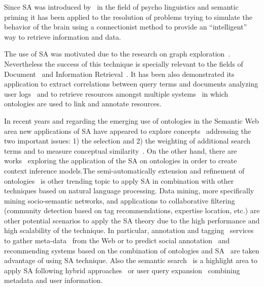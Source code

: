 Since SA was introduced by~\cite{Collins_Loftus_1975} in the field of 
psycho linguistics and semantic priming it has been applied to the resolution
of problems trying to simulate the behavior of the brain using a connectionist method
to provide an ``intelligent'' way to retrieve information and data. 

The use of SA was motivated due to the research on graph exploration~\cite{Scott1981,AndersonTheory}. Nevertheless
the success of this technique is specially relevant to the fields of Document~\cite{turtle91inference} 
and Information Retrieval~\cite{Cohen1987}. It has
been also demonstrated its application to extract correlations between query terms and documents analyzing user 
logs~\cite{Cui03} and to retrieve resources amongst multiple systems~\cite{Schumacher+2008search} 
in which ontologies are used to link and annotate resources.

In recent years and regarding the emerging use of ontologies in the Semantic Web area new applications of SA have
appeared to explore concepts~\cite{Qiu93,Chen95,Teufl:jucs_17_7:knowledge_extraction_from_RDF} addressing the two important issues: 1) the selection and 2) the weighting of
additional search terms and to measure conceptual similarity~\cite{gouws-vanrooyen-engelbrecht:2010:CCSR}. 
On the other hand, there are works~\cite{DBLP:journals/cogsr/KatiforiVD10} 
exploring the application of the SA on ontologies in order to create context inference models.The 
semi-automatically extension and refinement of ontologies~\cite{liu_et_al_2005} is other trending topic to apply SA
in combination with other techniques based on natural language processing. Data mining,
more specifically mining socio-semantic networks\cite{paper:troussov:2008}, and applications 
to collaborative filtering~\cite{Pham:jucs_17_4:a_clustering_approach_for} (community detection based on tag recommendations, expertise location, etc.) are other 
potential scenarios to apply the SA theory due to the high performance and high scalability of the technique. In particular, 
annotation and tagging~\cite{labraTagging2007} services to gather meta-data~\cite{GelgiVD05} from the Web or to predict social annotation~\cite{Chen:2007:PSA:1780653.1780702} and recommending 
systems based on the combination of ontologies and SA~\cite{citeulike:3779904} are taken advantage of using SA technique. 
Also the semantic search~\cite{conf-sofsem-Suchal08} is a highlight area to apply SA following
hybrid approaches~\cite{bopaEstonia,RochaSA04} or user query expansion~\cite{767402} combining metadata 
and user information.

